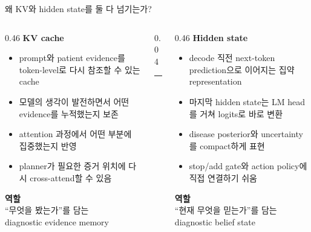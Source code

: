 \begin{frame}[t]{왜 KV와 hidden state를 둘 다 넘기는가?}
\small
\vspace{0.7em}
\begin{columns}[T,onlytextwidth]
\begin{column}{0.46\textwidth}
\centering
\textbf{\Large KV cache}
\vspace{0.8em}

\raggedright
\begin{itemize}
  \setlength{\itemsep}{0.9em}
  \item prompt와 patient evidence를 token-level로 다시 참조할 수 있는 cache
  \item 모델의 생각이 발전하면서 어떤 evidence를 누적했는지 보존
  \item attention 과정에서 어떤 부분에 집중했는지 반영
  \item planner가 필요한 증거 위치에 다시 cross-attend할 수 있음
\end{itemize}

\vspace{0.7em}
\textbf{역할}\\
``무엇을 봤는가''를 담는\\
diagnostic evidence memory
\end{column}

\begin{column}{0.04\textwidth}
\centering
\rule{0.7pt}{0.68\textheight}
\end{column}

\begin{column}{0.46\textwidth}
\centering
\textbf{\Large Hidden state}
\vspace{0.8em}

\raggedright
\begin{itemize}
  \setlength{\itemsep}{0.9em}
  \item decode 직전 next-token prediction으로 이어지는 집약 representation
  \item 마지막 hidden state는 LM head를 거쳐 logits로 바로 변환
  \item disease posterior와 uncertainty를 compact하게 표현
  \item stop/add gate와 action policy에 직접 연결하기 쉬움
\end{itemize}

\vspace{0.7em}
\textbf{역할}\\
``현재 무엇을 믿는가''를 담는\\
diagnostic belief state
\end{column}
\end{columns}
\end{frame}

